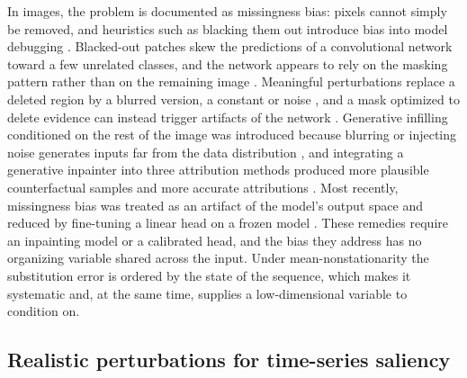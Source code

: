 \documentclass{article}
\begin{document}
In images, the problem is documented as missingness bias: pixels cannot simply be removed, and heuristics such as blacking them out introduce bias into model debugging \citep{jain2022missingness}. Blacked-out patches skew the predictions of a convolutional network toward a few unrelated classes, and the network appears to rely on the masking pattern rather than on the remaining image \citep{jain2022missingness}. Meaningful perturbations replace a deleted region by a blurred version, a constant or noise \citep{fong2017interpretable}, and a mask optimized to delete evidence can instead trigger artifacts of the network \citep{fong2017interpretable}. Generative infilling conditioned on the rest of the image was introduced because blurring or injecting noise generates inputs far from the data distribution \citep{chang2019explaining}, and integrating a generative inpainter into three attribution methods produced more plausible counterfactual samples and more accurate attributions \citep{agarwal2021explaining}. Most recently, missingness bias was treated as an artifact of the model's output space and reduced by fine-tuning a linear head on a frozen model \citep{sridhar2026missingness}. These remedies require an inpainting model or a calibrated head, and the bias they address has no organizing variable shared across the input. Under mean-nonstationarity the substitution error is ordered by the state of the sequence, which makes it systematic and, at the same time, supplies a low-dimensional variable to condition on.

\subsection{Realistic perturbations for time-series saliency}\label{sec:related:ts}
\end{document}
